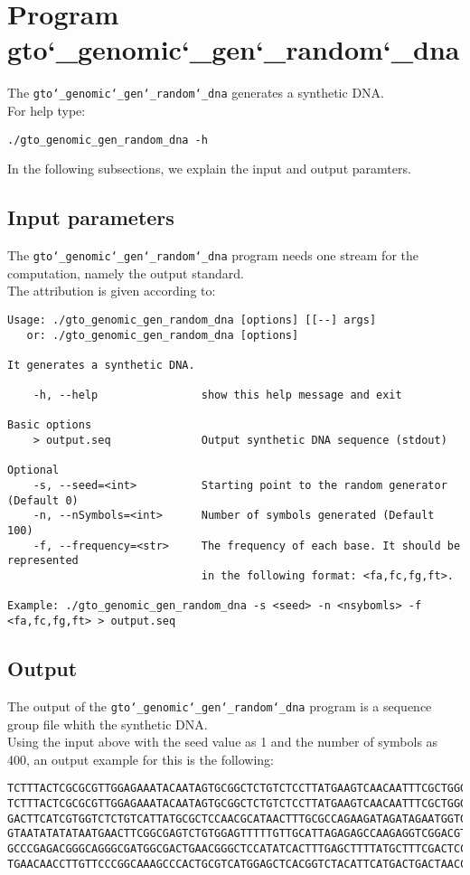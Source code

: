 \section{Program gto\char`_genomic\char`_gen\char`_random\char`_dna}
The \texttt{gto\char`_genomic\char`_gen\char`_random\char`_dna} generates a synthetic DNA.\\
For help type:
\begin{lstlisting}
./gto_genomic_gen_random_dna -h
\end{lstlisting}
In the following subsections, we explain the input and output paramters.

\subsection*{Input parameters}

The \texttt{gto\char`_genomic\char`_gen\char`_random\char`_dna} program needs one stream for the computation, namely the output standard.\\
The attribution is given according to:
\begin{lstlisting}
Usage: ./gto_genomic_gen_random_dna [options] [[--] args]
   or: ./gto_genomic_gen_random_dna [options]

It generates a synthetic DNA.

    -h, --help                show this help message and exit

Basic options
    > output.seq              Output synthetic DNA sequence (stdout)

Optional
    -s, --seed=<int>          Starting point to the random generator (Default 0)
    -n, --nSymbols=<int>      Number of symbols generated (Default 100)
    -f, --frequency=<str>     The frequency of each base. It should be represented 
    						  in the following format: <fa,fc,fg,ft>.

Example: ./gto_genomic_gen_random_dna -s <seed> -n <nsybomls> -f <fa,fc,fg,ft> > output.seq
\end{lstlisting}

\subsection*{Output}
The output of the \texttt{gto\char`_genomic\char`_gen\char`_random\char`_dna} program is a sequence group file whith the synthetic DNA.\\
Using the input above with the seed value as 1 and the number of symbols as 400, an output example for this is the following:
\begin{lstlisting}
TCTTTACTCGCGCGTTGGAGAAATACAATAGTGCGGCTCTGTCTCCTTATGAAGTCAACAATTTCGCTGGGACTTGCGGC
TCTTTACTCGCGCGTTGGAGAAATACAATAGTGCGGCTCTGTCTCCTTATGAAGTCAACAATTTCGCTGGGACTTGCGGC
GACTTCATCGTGGTCTCTGTCATTATGCGCTCCAACGCATAACTTTGCGCCAGAAGATAGATAGAATGGTGTAAGAAACT
GTAATATATATAATGAACTTCGGCGAGTCTGTGGAGTTTTTGTTGCATTAGAGAGCCAAGAGGTCGGACGTCCTCACGTA
GCCCGAGACGGGCAGGGCGATGGCGACTGAACGGGCTCCATATCACTTTGAGCTTTTATGCTTTCGACTCCTCCAGGAGC
TGAACAACCTTGTTCCCGGCAAAGCCCACTGCGTCATGGAGCTCACGGTCTACATTCATGACTGACTAACCGTAAACTGC
\end{lstlisting}
